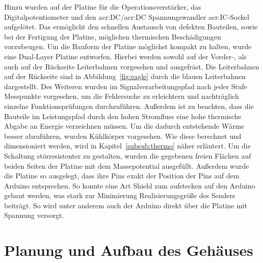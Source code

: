 Hinzu wurden auf der Platine für die Operationsverstärker, das Digitalpotentiometer und den \gls{acr:DC}/\gls{acr:DC} Spannungswandler \gls{acr:IC}-Sockel aufgelötet. Das ermöglicht den schnellen Austausch von defekten Bauteilen, sowie bei der Fertigung der Platine, möglichen thermischen Beschädigungen vorzubeugen. Um die Bauform der Platine möglichst kompakt zu halten, wurde eine Dual-Layer Platine entworfen. Hierbei werden sowohl auf der Vorder-, als auch auf der Rückseite Leiterbahnen vorgesehen und ausgefräst. Die Leiterbahnen auf der Rückseite sind in Abbildung~\ref{fig:eagle} durch die blauen Leiterbahnen dargestellt. Des Weiteren wurden im Signalverarbeitungspfad nach jeder Stufe Messpunkte vorgesehen, um die Fehlersuche zu erleichtern und nachträglich einzelne Funktionsprüfungen durchzuführen. Außerdem ist zu beachten, dass die Bauteile im Leistungspfad durch den hohen Stromfluss eine hohe thermische Abgabe an Energie verzeichnen müssen. Um die dadurch entstehende Wärme besser abzuführen, wurden Kühlkörper vorgesehen. Wie diese berechnet und dimensioniert werden, wird in Kapitel~\ref{subsub:thermo} näher erläutert. Um die Schaltung störresistenter zu gestalten, wurden die gegebenen freien Flächen auf beiden Seiten der Platine mit dem Massepotential ausgefüllt. Außerdem wurde die Platine so ausgelegt, dass ihre Pins exakt der Position der Pins auf dem Arduino entsprechen. So konnte eine Art Shield zum aufstecken auf den Arduino gebaut werden, was stark zur Minimierung Realisierungsgröße des Senders beiträgt. So wird unter anderem auch der Arduino direkt über die Platine mit Spannung versorgt. 

\newpage
\section{Planung und Aufbau des Gehäuses}
\label{sec:geh}


